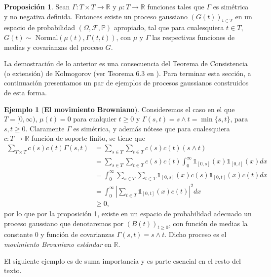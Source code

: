 \documentclass[letterpaper,twoside,12pt]{book}
\newcommand{\R}{\mathbb{R}}
\newcommand{\F}{\mathcal{F}}
\renewcommand{\P}{\mathbb{P}}
\newcommand{\1}{\mathds{1}}
\newcommand{\abs}[1]{\left\lvert #1 \right\rvert}
\renewcommand{\to}{\rightarrow}
\theoremstyle{definition}
\theoremstyle{definition}
\theoremstyle{remark}
\theoremstyle{definition}
\theoremstyle{definition}
\newtheorem{prop}{Proposición}
\theoremstyle{definition}
\theoremstyle{definition}
\newtheorem{ejem}{Ejemplo}
\theoremstyle{definition}
\begin{document}
\begin{prop}\label{caractprocgauss}
 Sean $\Gamma:T\times T\to \R$ y $\mu:T\to \R$ funciones tales que $\Gamma$ es simétrica y no negativa definida. Entonces existe un proceso gaussiano $(G(t))_{t\in T}$ en un espacio de probabilidad $(\Omega, \F,\P)$ apropiado, tal que para cualesquiera $t\in T$, $G(t)\sim$ Normal$(\mu(t),\Gamma(t,t))$, con $\mu$ y $\Gamma$ las respectivas funciones de medias y covarianzas del proceso $G$.
 \end{prop}
 La demostración de lo anterior es una consecuencia del Teorema de Consistencia (o extensión) de Kolmogorov (ver Teorema 6.3 en \cite{gall2016brownian} ). Para terminar esta sección, a continuación presentamos un par de ejemplos de procesos gaussianos construidos de esta forma.
\begin{ejem}[\textbf{El movimiento Browniano}]
Consideremos el caso en el que $T=[0,\infty)$, $\mu(t)=0$ para cualquier $t\geq0$ y $\Gamma(s,t)=s\wedge t=\min\{s,t\}$, para $s,t\geq0$. Claramente $\Gamma$ es simétrica, y además nótese que para cualesquiera $c:T\to\R$ función de soporte finito, se tiene que
\begin{align*}
\sum_{T\times T}^{}c(s)c(t)\Gamma(s,t)&=\sum_{s\in T}^{}\sum_{t\in T}c(s)c(t)(s\wedge t)\\
&=\sum_{s\in T}^{}\sum_{t\in T}c(s)c(t)\int_{0}^{\infty}\1_{[0,s]}(x)\1_{[0,t]}(x)dx\\
&=\int_{0}^{\infty}\sum_{s\in T}\sum_{t\in T}\1_{[0,s]}(x)c(s)\1_{[0,t]}(x)c(t)dx\\
&=\int_{0}^{\infty}\abs{\sum_{t\in T}\1_{[0,t]}(x)c(t)}^2dx\\
&\geq0,
\end{align*}
por lo que por la proposición \ref{caractprocgauss}, existe en un espacio de probabilidad adecuado un proceso gaussiano que denotaremos por $(B(t))_{t\geq0}$, con función de medias la constante 0 y función de covarianzas $\Gamma(s,t)=s\wedge t$. Dicho proceso es el \textit{movimiento Browniano estándar} en $\R$.
 \end{ejem}
El siguiente ejemplo es de suma importancia y es parte esencial en el resto del texto.
\end{document}
